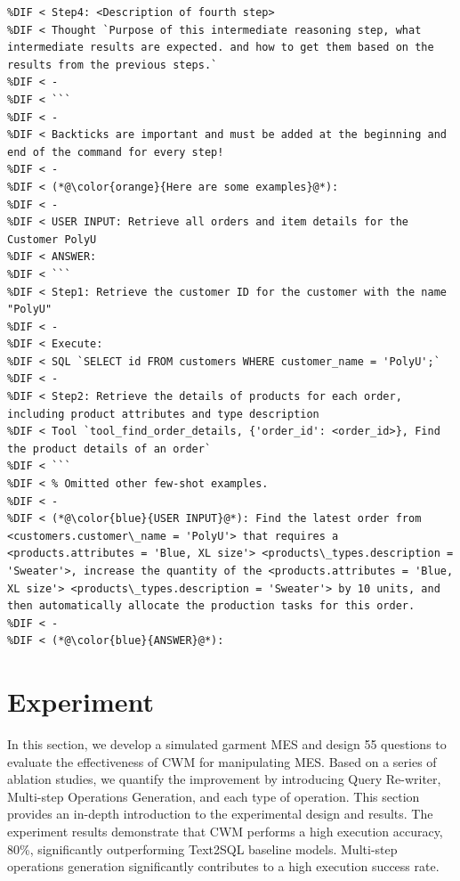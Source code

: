 \documentclass[preprint,12pt]{elsarticle}
\providecommand{\DIFdelend}{} %
\providecommand{\DIFmodend}{} %
\DeclareRobustCommand{\DIFdelend}{\DIFOaddend \let\includegraphics\DIFOincludegraphics} %
\begin{document}
\begin{lstlisting}[style=prompt, label={lst:plan_prompt},caption={},aboveskip=0pt, belowskip=0pt,alsolanguage=DIFcode]
%DIF < -
%DIF < Step4: <Description of fourth step>
%DIF < Thought `Purpose of this intermediate reasoning step, what intermediate results are expected. and how to get them based on the results from the previous steps.`
%DIF < -
%DIF < ```
%DIF < -
%DIF < Backticks are important and must be added at the beginning and end of the command for every step!
%DIF < -
%DIF < (*@\color{orange}{Here are some examples}@*):
%DIF < -
%DIF < USER INPUT: Retrieve all orders and item details for the Customer PolyU
%DIF < ANSWER:
%DIF < ```
%DIF < Step1: Retrieve the customer ID for the customer with the name "PolyU"
%DIF < -
%DIF < Execute:
%DIF < SQL `SELECT id FROM customers WHERE customer_name = 'PolyU';`
%DIF < -
%DIF < Step2: Retrieve the details of products for each order, including product attributes and type description
%DIF < Tool `tool_find_order_details, {'order_id': <order_id>}, Find the product details of an order`
%DIF < ```
%DIF < % Omitted other few-shot examples.
%DIF < -
%DIF < (*@\color{blue}{USER INPUT}@*): Find the latest order from <customers.customer\_name = 'PolyU'> that requires a <products.attributes = 'Blue, XL size'> <products\_types.description = 'Sweater'>, increase the quantity of the <products.attributes = 'Blue, XL size'> <products\_types.description = 'Sweater'> by 10 units, and then automatically allocate the production tasks for this order.
%DIF < -
%DIF < (*@\color{blue}{ANSWER}@*): 
\end{lstlisting}
\DIFmodend %
\DIFdelend 




\section{Experiment}
\label{sec:exp}
In this section, we develop a simulated garment MES and design 55 questions to evaluate the effectiveness of CWM for manipulating MES. 
Based on a series of ablation studies, we quantify the improvement by introducing Query Re-writer, Multi-step Operations Generation, and each type of operation.
This section provides an in-depth introduction to the experimental design and results. 
The experiment results demonstrate that CWM performs a high execution accuracy, 80\%, significantly outperforming Text2SQL baseline models. 
Multi-step operations generation significantly contributes to a high execution success rate.
\end{document}
